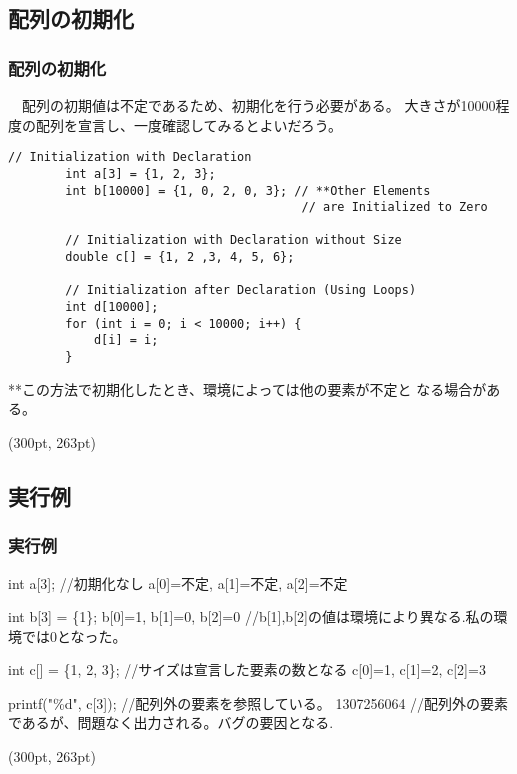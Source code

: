 \documentclass[dvipdfmx]{beamer}
\begin{document}
\subsection{配列の初期化}
\begin{frame}[t, fragile]
    \frametitle{配列の初期化}
    　配列の初期値は不定であるため、初期化を行う必要がある。
    大きさが10000程度の配列を宣言し、一度確認してみるとよいだろう。
    \begin{lstlisting}[gobble=8, caption=Example\space of\space Array\space\space Initialization]
        // Initialization with Declaration
        int a[3] = {1, 2, 3};
        int b[10000] = {1, 0, 2, 0, 3}; // **Other Elements  
                                         // are Initialized to Zero
        
        // Initialization with Declaration without Size
        double c[] = {1, 2 ,3, 4, 5, 6};

        // Initialization after Declaration (Using Loops)
        int d[10000];
        for (int i = 0; i < 10000; i++) {
            d[i] = i;
        }
    \end{lstlisting}
    **\space この方法で初期化したとき、環境によっては他の要素が不定と
    なる場合がある。
    \begin{textblock*}{0.3\linewidth}(300pt, 263pt)
        \space
    \end{textblock*}
\end{frame}

\subsection{実行例}
\begin{frame}[t, fragile]
    \frametitle{実行例}
    \begin{block}{int a[3]; //初期化なし}
        a[0]=不定, a[1]=不定, a[2]=不定
    \end{block}
    \begin{block}{int b[3] = \{1\};}
        b[0]=1, b[1]=0, b[2]=0 //b[1],b[2]の値は環境により異なる.私の環境では0となった。
    \end{block}
    \begin{block}{int c[] = \{1, 2, 3\}; //サイズは宣言した要素の数となる}
        c[0]=1, c[1]=2, c[2]=3
    \end{block}
    \begin{block}{printf("\%d", c[3]); //配列外の要素を参照している。} 
        1307256064 //配列外の要素であるが、問題なく出力される。バグの要因となる.
    \end{block}
    \begin{textblock*}{0.3\linewidth}(300pt, 263pt)
        \space
    \end{textblock*}
\end{frame}
\end{document}

